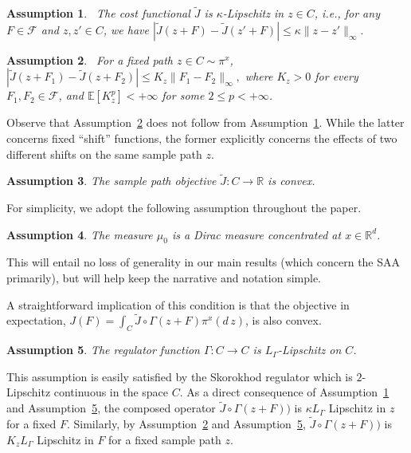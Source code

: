 \documentclass[11pt,leqno]{amsart}
\newtheorem{assumption}{Assumption}
\begin{document}
\begin{assumption}~\label{ass:LipschitzinZ}
    The cost functional $\tilde J$ is $\kappa$-Lipschitz in $z \in C$, i.e., for any $F\in\mathcal F$ and $z,z' \in C$, we have $        |\tilde J(z+F)-\tilde J(z'+F)|\leq \kappa\|z-z'\|_{\infty}.$
\end{assumption}

\begin{assumption}~\label{ass:LipschitzinF}
    For a fixed path $z\in C\sim\pi^x$,  $|\tilde{J}(z+F_1) - \tilde{J}(z+F_2)| \leq K_{z} \|F_1-F_2\|_\infty,$ where $K_{z} > 0$ for every  $F_1, F_2 \in \mathcal F$, and {$\mathbb E[K_{z}^p] < +\infty$} for some $2 \leq p < +\infty$.
\end{assumption}
Observe that Assumption~\ref{ass:LipschitzinF} does not follow from Assumption~\ref{ass:LipschitzinZ}. While the latter concerns fixed ``shift'' functions, the former explicitly concerns the effects of two different shifts on the same sample path $z$.
\begin{assumption}
    The sample path objective $\tilde J : C \to \mathbb R$ is convex. 
\end{assumption}

For simplicity, we adopt the following assumption throughout the paper.
\begin{assumption}\label{ass:fix_mu0}
    The measure $\mu_0$ is a Dirac measure concentrated at $x \in \mathbb R^d$.
\end{assumption}
This will entail no loss of generality in our main results (which concern the SAA primarily), but will help keep the narrative and notation simple.

A straightforward implication of this condition is that the objective in expectation, $J(F) = \int_C \tilde J \circ \Gamma(z+F) \pi^x(d\,z)$, is also convex. %

\begin{assumption}\label{ass:GammaLipschitz}
    The regulator function $\Gamma:C\rightarrow C$ is $L_\Gamma$-Lipschitz on $C$. %
\end{assumption}
This assumption is easily satisfied by the Skorokhod regulator which is $2$-Lipschitz continuous in the space $C$. As a direct consequence of Assumption~\ref{ass:LipschitzinZ} and Assumption~\ref{ass:GammaLipschitz}, the composed operator $\tilde{J}\circ\Gamma(z + F))$ is $\kappa L_\Gamma$ Lipschitz in $z$ for a fixed $F$. Similarly, by Assumption~\ref{ass:LipschitzinF} and Assumption~\ref{ass:GammaLipschitz}, $\tilde{J}\circ\Gamma(z + F))$ is $K_{z} L_\Gamma$ Lipschitz in $F$ for a fixed sample path $z$.
\end{document}

